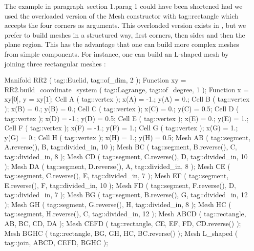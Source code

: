 The example in paragraph~\numb section 1.\numb parag 1 could have been shortened had we used 
the overloaded version of the {\codett Mesh} constructor with {\codett tag::rectangle} which
accepts the four corners as arguments. 
This overloaded version exists in \maniFEM, but we prefer to build meshes in a structured way, 
first corners, then sides and then the plane region. 
This has the advantage that one can build more complex meshes from simple components. 
For instance, one can build an L-shaped mesh by joining three rectangular meshes :

\verbatim
   Manifold RR2 ( tag::Euclid, tag::of_dim, 2 );
   Function xy = RR2.build_coordinate_system ( tag::Lagrange, tag::of_degree, 1 );
   Function x = xy[0],  y = xy[1];
   Cell A ( tag::vertex );  x(A) = -1.;  y(A) = 0.;
   Cell B ( tag::vertex );  x(B) =  0.;  y(B) = 0.;
   Cell C ( tag::vertex );  x(C) =  0.;  y(C) = 0.5;
   Cell D ( tag::vertex );  x(D) = -1.;  y(D) = 0.5;
   Cell E ( tag::vertex );  x(E) =  0.;  y(E) = 1.;
   Cell F ( tag::vertex );  x(F) = -1.;  y(F) = 1.;
   Cell G ( tag::vertex );  x(G) =  1.;  y(G) = 0.;
   Cell H ( tag::vertex );  x(H) =  1.;  y(H) = 0.5;
   Mesh AB ( tag::segment, A.reverse(), B, tag::divided_in, 10 );
   Mesh BC ( tag::segment, B.reverse(), C, tag::divided_in, 8 );
   Mesh CD ( tag::segment, C.reverse(), D, tag::divided_in, 10 );
   Mesh DA ( tag::segment, D.reverse(), A, tag::divided_in, 8 );
   Mesh CE ( tag::segment, C.reverse(), E, tag::divided_in, 7 );
   Mesh EF ( tag::segment, E.reverse(), F, tag::divided_in, 10 );
   Mesh FD ( tag::segment, F.reverse(), D, tag::divided_in, 7 );
   Mesh BG ( tag::segment, B.reverse(), G, tag::divided_in, 12 );
   Mesh GH ( tag::segment, G.reverse(), H, tag::divided_in, 8 );
   Mesh HC ( tag::segment, H.reverse(), C, tag::divided_in, 12 );
   Mesh ABCD ( tag::rectangle, AB, BC, CD, DA );
   Mesh CEFD ( tag::rectangle, CE, EF, FD, CD.reverse() );
   Mesh BGHC ( tag::rectangle, BG, GH, HC, BC.reverse() );
   Mesh L_shaped ( tag::join, ABCD, CEFD, BGHC );
\endverbatim

